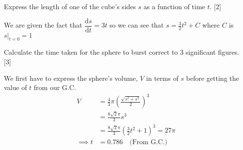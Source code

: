 \documentclass[12pt, a4 paper]{article}
\begin{document}
\begin{outline}[enumerate]
 \2 Express the length of one of the cube's sides \(s\) as a function of time \(t\). \hfill[2]
 \begin{answer}
  We are given the fact that \(\dfrac{\mathrm{d}s}{\mathrm{d}t}=3t\) so we can see that \(s=\frac{3}{2}t^2+C\) where \(C\) is \(s|_{t=0}=1\)
 \end{answer}

 \2 Calculate the time taken for the sphere to burst correct to 3 significant figures. \hfill[3]
 \begin{answer}
  We first have to express the sphere's volume, \(V\) in terms of \(s\) before getting the value of \(t\) from our G.C.
  \begin{align*}
   V          & = \frac{4}{3}\pi \left(\frac{\sqrt{s^2+s^2}}{2}\right)^3      \\
              & = \frac{8\sqrt2\pi}{3}s^3                                     \\
              & = \frac{8\sqrt2\pi}{3}\left(\frac{3}{2}t^2+1\right)^3 = 27\pi \\
   \implies t & = 0.786 \quad\textrm{(From G.C.)}\quad
  \end{align*}
 \end{answer}


\end{outline}
\end{document}
